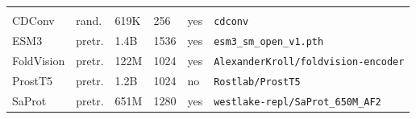\begin{longtable}{P{2.15cm}P{1cm}P{.85cm}P{.6cm}P{.85cm}P{6.25cm}}
 \\*
CDConv        & rand.  & 619K & 256  & yes & \texttt{cdconv} \\
ESM3          & pretr. & 1.4B & 1536 & yes & \texttt{esm3\_\allowbreak sm\_\allowbreak open\_\allowbreak v1.pth} \\
FoldVision    & pretr. & 122M & 1024 & yes & \texttt{AlexanderKroll/\allowbreak foldvision-encoder} \\
ProstT5       & pretr. & 1.2B & 1024 & no  & \texttt{Rostlab/\allowbreak ProstT5} \\
SaProt        & pretr. & 651M & 1280 & yes & \texttt{westlake-repl/\allowbreak SaProt\_\allowbreak 650M\_\allowbreak AF2} \\


\end{longtable}
\endgroup
